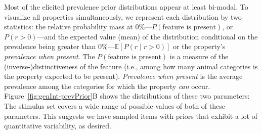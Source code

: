 \documentclass[floatsintext,doc]{apa6}
\begin{document}
Most of the elicited prevalence prior distributions appear at least bi-modal.
To visualize all properties simultaneously, we represent each distribution by two statistics: the relative probability mass at 0\%---\(P(\text{feature is present})\), or \(P(r > 0)\)---and the expected value (mean) of the distribution conditional on the prevalence being greater than 0\%---\(\mathbb{E}[P(r \mid r>0)]\) or the property's \emph{prevalence when present}.
The $P(\text{feature is present})$ is a measure of the (inverse-)distinctiveness of the feature (i.e., among how many animal categories is the property expected to be present). 
\emph{Prevalence when present} is the average prevalence among the categories for which the property \emph{can} occur. 
Figure~\ref{fig:genInt-prevPrior}B shows the distributions of these two parameters: The stimulus set covers a wide range of possible values of both of these parameters.
This suggests we have sampled items with priors that exhibit a lot of quantitative variability, as desired.
\end{document}
